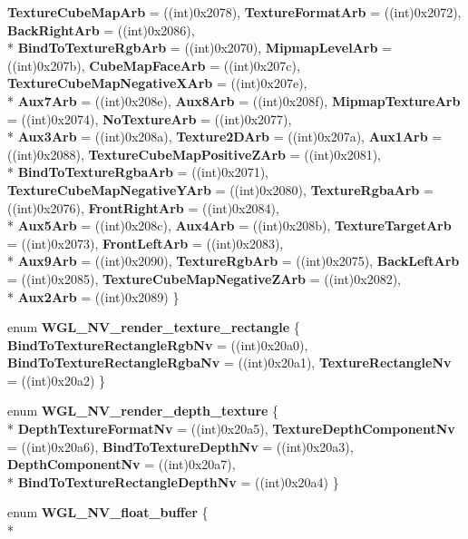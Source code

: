 \begin{DoxyCompactItemize}
{\bfseries Texture\-Cube\-Map\-Arb} = ((int)0x2078), 
{\bfseries Texture\-Format\-Arb} = ((int)0x2072), 
{\bfseries Back\-Right\-Arb} = ((int)0x2086), 
\\*
{\bfseries Bind\-To\-Texture\-Rgb\-Arb} = ((int)0x2070), 
{\bfseries Mipmap\-Level\-Arb} = ((int)0x207b), 
{\bfseries Cube\-Map\-Face\-Arb} = ((int)0x207c), 
{\bfseries Texture\-Cube\-Map\-Negative\-X\-Arb} = ((int)0x207e), 
\\*
{\bfseries Aux7\-Arb} = ((int)0x208e), 
{\bfseries Aux8\-Arb} = ((int)0x208f), 
{\bfseries Mipmap\-Texture\-Arb} = ((int)0x2074), 
{\bfseries No\-Texture\-Arb} = ((int)0x2077), 
\\*
{\bfseries Aux3\-Arb} = ((int)0x208a), 
{\bfseries Texture2\-D\-Arb} = ((int)0x207a), 
{\bfseries Aux1\-Arb} = ((int)0x2088), 
{\bfseries Texture\-Cube\-Map\-Positive\-Z\-Arb} = ((int)0x2081), 
\\*
{\bfseries Bind\-To\-Texture\-Rgba\-Arb} = ((int)0x2071), 
{\bfseries Texture\-Cube\-Map\-Negative\-Y\-Arb} = ((int)0x2080), 
{\bfseries Texture\-Rgba\-Arb} = ((int)0x2076), 
{\bfseries Front\-Right\-Arb} = ((int)0x2084), 
\\*
{\bfseries Aux5\-Arb} = ((int)0x208c), 
{\bfseries Aux4\-Arb} = ((int)0x208b), 
{\bfseries Texture\-Target\-Arb} = ((int)0x2073), 
{\bfseries Front\-Left\-Arb} = ((int)0x2083), 
\\*
{\bfseries Aux9\-Arb} = ((int)0x2090), 
{\bfseries Texture\-Rgb\-Arb} = ((int)0x2075), 
{\bfseries Back\-Left\-Arb} = ((int)0x2085), 
{\bfseries Texture\-Cube\-Map\-Negative\-Z\-Arb} = ((int)0x2082), 
\\*
{\bfseries Aux2\-Arb} = ((int)0x2089)
 \}
\item 
enum {\bfseries W\-G\-L\-\_\-\-N\-V\-\_\-render\-\_\-texture\-\_\-rectangle} \{ {\bfseries Bind\-To\-Texture\-Rectangle\-Rgb\-Nv} = ((int)0x20a0), 
{\bfseries Bind\-To\-Texture\-Rectangle\-Rgba\-Nv} = ((int)0x20a1), 
{\bfseries Texture\-Rectangle\-Nv} = ((int)0x20a2)
 \}
\item 
enum {\bfseries W\-G\-L\-\_\-\-N\-V\-\_\-render\-\_\-depth\-\_\-texture} \{ \\*
{\bfseries Depth\-Texture\-Format\-Nv} = ((int)0x20a5), 
{\bfseries Texture\-Depth\-Component\-Nv} = ((int)0x20a6), 
{\bfseries Bind\-To\-Texture\-Depth\-Nv} = ((int)0x20a3), 
{\bfseries Depth\-Component\-Nv} = ((int)0x20a7), 
\\*
{\bfseries Bind\-To\-Texture\-Rectangle\-Depth\-Nv} = ((int)0x20a4)
 \}
\item 
enum {\bfseries W\-G\-L\-\_\-\-N\-V\-\_\-float\-\_\-buffer} \{ \\*

\end{DoxyCompactItemize}
